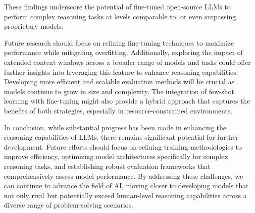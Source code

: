 \documentclass[conference]{IEEEtran}
\begin{document}
These findings underscore the potential of fine-tuned open-source LLMs to perform complex reasoning tasks at levels comparable to, or even surpassing, proprietary models.

Future research should focus on refining fine-tuning techniques to maximize performance while mitigating overfitting. Additionally, exploring the impact of extended context windows across a broader range of models and tasks could offer further insights into leveraging this feature to enhance reasoning capabilities. Developing more efficient and scalable evaluation methods will be crucial as models continue to grow in size and complexity. The integration of few-shot learning with fine-tuning might also provide a hybrid approach that captures the benefits of both strategies, especially in resource-constrained environments.

In conclusion, while substantial progress has been made in enhancing the reasoning capabilities of LLMs, there remains significant potential for further development. Future efforts should focus on refining training methodologies to improve efficiency, optimizing model architectures specifically for complex reasoning tasks, and establishing robust evaluation frameworks that comprehensively assess model performance. By addressing these challenges, we can continue to advance the field of AI, moving closer to developing models that not only rival but potentially exceed human-level reasoning capabilities across a diverse range of problem-solving scenarios.
\fi




\end{document}
